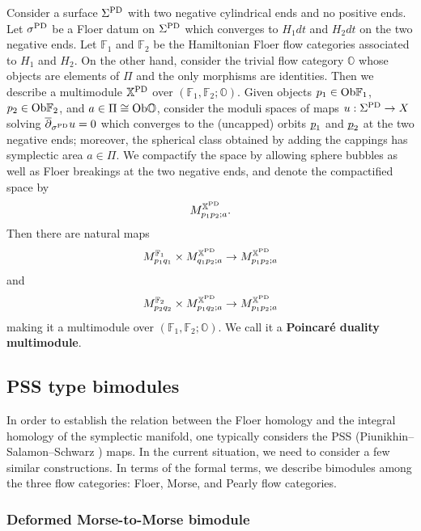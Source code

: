 \documentclass[reqno, 10pt]{amsart}
\numberwithin{equation}{section}
\numberwithin{equation}{section}
\theoremstyle{definition}
\theoremstyle{remark}
\newcommand{\beqn}{\begin{equation*}}
\newcommand{\eeqn}{\end{equation*}}
\newcommand{\ov}{\overline}
\newcommand{\mb}{\mathbb}
\newcommand{\uds}[1]{\underline{\smash{#1}}}
\begin{document}
Consider a surface $\Sigma^{\rm PD}$ with two negative cylindrical ends and no positive ends. Let $\sigma^{\rm PD}$ be a Floer datum on $\Sigma^{\rm PD}$ which converges to $H_1 dt$ and $H_2 dt$ on the two negative ends. Let ${\mb F}_1$ and ${\mb F}_2$ be the Hamiltonian Floer flow categories associated to $H_1$ and $H_2$. On the other hand, consider the trivial flow category ${\mb O}$ whose objects are elements of $\Pi$ and the only morphisms are identities. Then we describe a multimodule ${\mb X}^{\rm PD}$ over $({\mb F}_1, {\mb F}_2; {\mb O})$. Given objects $p_1\in {\rm Ob}{\mb F}_1$, $p_2 \in {\rm Ob}{\mb F}_2$, and $a \in \Pi \cong {\rm Ob} {\mb O}$, consider the moduli spaces of maps $u: \Sigma^{\rm PD} \to X$ solving $\ov\partial_{\sigma^{\rm PD}} u= 0$ which converges to the (uncapped) orbits $\uds p_1$ and $\uds p_2$ at the two negative ends; moreover, the spherical class obtained by adding the cappings has symplectic area $a\in \Pi$. We compactify the space by allowing sphere bubbles as well as Floer breakings at the two negative ends, and denote the compactified space by 
\beqn
M_{p_1 p_2; a}^{{\mb X}^{\rm PD}}.
\eeqn
Then there are natural maps
\beqn
M_{p_1 q_1}^{{\mb F}_1} \times M_{q_1 p_2; a}^{{\mb X}^{\rm PD}} \to M_{p_1 p_2; a}^{{\mb X}^{\rm PD}}
\eeqn
and 
\beqn
M_{p_2 q_2}^{{\mb F}_2} \times M_{p_1 q_2; a}^{\mb{X}^{\rm PD}} \to M_{p_1 p_2; a}^{{\mb X}^{\rm PD}}
\eeqn
making it a multimodule over $({\mb F}_1, {\mb F}_2; {\mb O})$. We call it a {\bf Poincar\'e duality multimodule}. 












\subsection{PSS type bimodules}\label{subsection_PSS}

In order to establish the relation between the Floer homology and the integral homology of the symplectic manifold, one typically considers the PSS (Piunikhin--Salamon--Schwarz \cite{PSS}) maps. In the current situation, we need to consider a few similar constructions. In terms of the formal terms, we describe bimodules among the three flow categories: Floer, Morse, and Pearly flow categories.  

\subsubsection{Deformed Morse-to-Morse bimodule}
\end{document}
